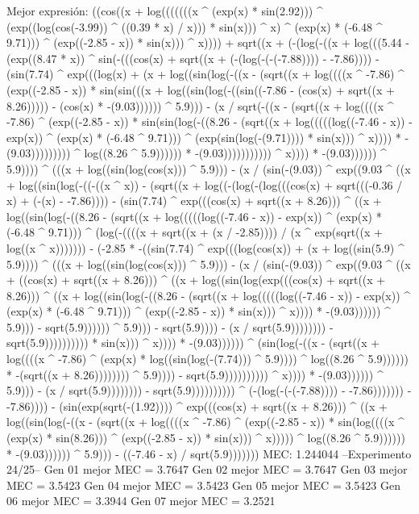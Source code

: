 Mejor expresión: ((cos((x + log(((((((x ^ (exp(x) * sin(2.92))) ^ (exp((log(cos(-3.99)) ^ ((0.39 * x) / x))) * sin(x))) ^ x) ^ (exp(x) * (-6.48 ^ 9.71))) ^ (exp((-2.85 - x)) * sin(x))) ^ x)))) + sqrt((x + (-(log(-((x + log(((5.44 - (exp((8.47 * x)) ^ sin(-(((cos(x) + sqrt((x + (-(log(-(-(-7.88)))) - -7.86)))) - (sin(7.74) ^ exp(((log(x) + (x + log((sin(log(-((x - (sqrt((x + log((((x ^ -7.86) ^ (exp((-2.85 - x)) * sin(sin(((x + log((sin(log(-((sin((-7.86 - (cos(x) + sqrt((x + 8.26))))) - (cos(x) * -(9.03)))))) ^ 5.9))) - (x / sqrt(-((x - (sqrt((x + log((((x ^ -7.86) ^ (exp((-2.85 - x)) * sin(sin(log(-((8.26 - (sqrt((x + log(((((log((-7.46 - x)) - exp(x)) ^ (exp(x) * (-6.48 ^ 9.71))) ^ (exp(sin(log(-(9.71)))) * sin(x))) ^ x)))) * -(9.03))))))))) ^ log((8.26 ^ 5.9)))))) * -(9.03))))))))))) ^ x)))) * -(9.03)))))) ^ 5.9)))) ^ (((x + log((sin(log(cos(x))) ^ 5.9))) - (x / (sin(-(9.03)) ^ exp((9.03 ^ ((x + log((sin(log(-((-((x ^ x)) - (sqrt((x + log((-(log(-(log(((cos(x) + sqrt(((-0.36 / x) + (-(x) - -7.86)))) - (sin(7.74) ^ exp(((cos(x) + sqrt((x + 8.26))) ^ ((x + log((sin(log(-((8.26 - (sqrt((x + log(((((log((-7.46 - x)) - exp(x)) ^ (exp(x) * (-6.48 ^ 9.71))) ^ (log(-((((x + sqrt((x + (x / -2.85)))) / (x ^ exp(sqrt((x + log((x ^ x))))))) - (-2.85 * -((sin(7.74) ^ exp(((log(cos(x)) + (x + log((sin(5.9) ^ 5.9)))) ^ (((x + log((sin(log(cos(x))) ^ 5.9))) - (x / (sin(-(9.03)) ^ exp((9.03 ^ ((x + ((cos(x) + sqrt((x + 8.26))) ^ ((x + log((sin(log(exp(((cos(x) + sqrt((x + 8.26))) ^ ((x + log((sin(log(-((8.26 - (sqrt((x + log(((((log((-7.46 - x)) - exp(x)) ^ (exp(x) * (-6.48 ^ 9.71))) ^ (exp((-2.85 - x)) * sin(x))) ^ x)))) * -(9.03)))))) ^ 5.9))) - sqrt(5.9)))))) ^ 5.9))) - sqrt(5.9)))) - (x / sqrt(5.9)))))))) - sqrt(5.9)))))))))) * sin(x))) ^ x)))) * -(9.03)))))) ^ (sin(log(-((x - (sqrt((x + log((((x ^ -7.86) ^ (exp(x) * log((sin(log(-(7.74))) ^ 5.9)))) ^ log((8.26 ^ 5.9)))))) * -(sqrt((x + 8.26)))))))) ^ 5.9)))) - sqrt(5.9)))))))))) ^ x)))) * -(9.03)))))) ^ 5.9))) - (x / sqrt(5.9)))))))) - sqrt(5.9)))))))))) ^ (-(log(-(-(-7.88)))) - -7.86))))))) - -7.86)))) - (sin(exp(sqrt(-(1.92)))) ^ exp(((cos(x) + sqrt((x + 8.26))) ^ ((x + log((sin(log(-((x - (sqrt((x + log((((x ^ -7.86) ^ (exp((-2.85 - x)) * sin(log((((x ^ (exp(x) * sin(8.26))) ^ (exp((-2.85 - x)) * sin(x))) ^ x))))) ^ log((8.26 ^ 5.9)))))) * -(9.03)))))) ^ 5.9))) - ((-7.46 - x) / sqrt(5.9)))))))
MEC: 1.244044
--Experimento 
 24/25--
Gen 01 mejor MEC = 3.7647
Gen 02 mejor MEC = 3.7647
Gen 03 mejor MEC = 3.5423
Gen 04 mejor MEC = 3.5423
Gen 05 mejor MEC = 3.5423
Gen 06 mejor MEC = 3.3944
Gen 07 mejor MEC = 3.2521
